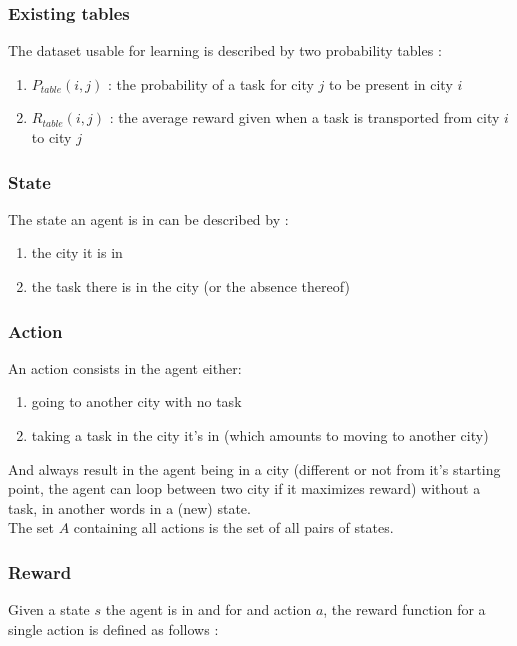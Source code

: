 \documentclass[11pt]{article}
\begin{document}
\subsubsection{Existing tables}

The dataset usable for learning is described by two probability tables :

\begin{enumerate}
    \item $P_{table}(i,j)$ : the probability of a task for city $j$ to be present in city $i$
    \item $R_{table}(i,j)$ : the average reward given when a task is transported from city $i$ to city $j$
\end{enumerate}

\subsubsection{State} 
The state an agent is in can be described by :

\begin{enumerate}
    \item the city it is in
    \item the task there is in the city (or the absence thereof)
\end{enumerate}

\subsubsection{Action}
An action consists in the agent either:
\begin{enumerate}
    \item going to another city with no task
    \item taking a task in the city it's in (which amounts to moving to another city)
\end{enumerate}
And always result in the agent being in a city (different or not from it's starting point, the agent can loop between two city if it maximizes reward) without a task, in another words in a (new) state. \\

The set $A$ containing all actions is the set of all pairs of states.
\subsubsection{Reward}

Given a state $s$ the agent is in and for and action $a$, the reward function for a single action is defined as follows :
\end{document}
